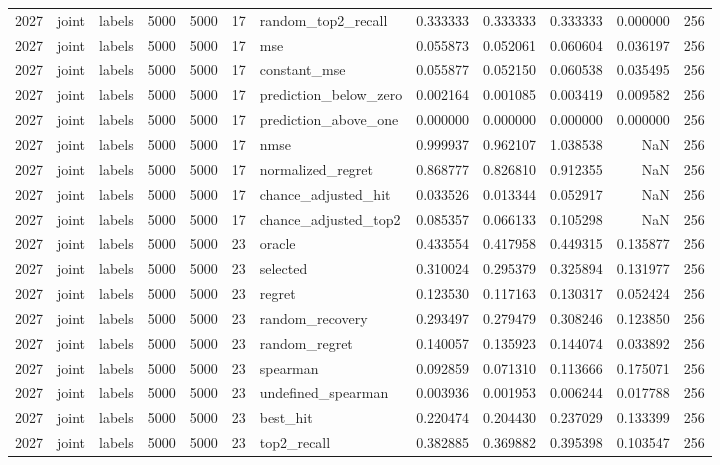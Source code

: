 \begin{tabular}{rllrrrlrrrrr}
2027 & joint & labels & 5000 & 5000 & 17 & random_top2_recall & 0.333333 & 0.333333 & 0.333333 & 0.000000 & 256 \\
2027 & joint & labels & 5000 & 5000 & 17 & mse & 0.055873 & 0.052061 & 0.060604 & 0.036197 & 256 \\
2027 & joint & labels & 5000 & 5000 & 17 & constant_mse & 0.055877 & 0.052150 & 0.060538 & 0.035495 & 256 \\
2027 & joint & labels & 5000 & 5000 & 17 & prediction_below_zero & 0.002164 & 0.001085 & 0.003419 & 0.009582 & 256 \\
2027 & joint & labels & 5000 & 5000 & 17 & prediction_above_one & 0.000000 & 0.000000 & 0.000000 & 0.000000 & 256 \\
2027 & joint & labels & 5000 & 5000 & 17 & nmse & 0.999937 & 0.962107 & 1.038538 & NaN & 256 \\
2027 & joint & labels & 5000 & 5000 & 17 & normalized_regret & 0.868777 & 0.826810 & 0.912355 & NaN & 256 \\
2027 & joint & labels & 5000 & 5000 & 17 & chance_adjusted_hit & 0.033526 & 0.013344 & 0.052917 & NaN & 256 \\
2027 & joint & labels & 5000 & 5000 & 17 & chance_adjusted_top2 & 0.085357 & 0.066133 & 0.105298 & NaN & 256 \\
2027 & joint & labels & 5000 & 5000 & 23 & oracle & 0.433554 & 0.417958 & 0.449315 & 0.135877 & 256 \\
2027 & joint & labels & 5000 & 5000 & 23 & selected & 0.310024 & 0.295379 & 0.325894 & 0.131977 & 256 \\
2027 & joint & labels & 5000 & 5000 & 23 & regret & 0.123530 & 0.117163 & 0.130317 & 0.052424 & 256 \\
2027 & joint & labels & 5000 & 5000 & 23 & random_recovery & 0.293497 & 0.279479 & 0.308246 & 0.123850 & 256 \\
2027 & joint & labels & 5000 & 5000 & 23 & random_regret & 0.140057 & 0.135923 & 0.144074 & 0.033892 & 256 \\
2027 & joint & labels & 5000 & 5000 & 23 & spearman & 0.092859 & 0.071310 & 0.113666 & 0.175071 & 256 \\
2027 & joint & labels & 5000 & 5000 & 23 & undefined_spearman & 0.003936 & 0.001953 & 0.006244 & 0.017788 & 256 \\
2027 & joint & labels & 5000 & 5000 & 23 & best_hit & 0.220474 & 0.204430 & 0.237029 & 0.133399 & 256 \\
2027 & joint & labels & 5000 & 5000 & 23 & top2_recall & 0.382885 & 0.369882 & 0.395398 & 0.103547 & 256 \\

\end{tabular}
